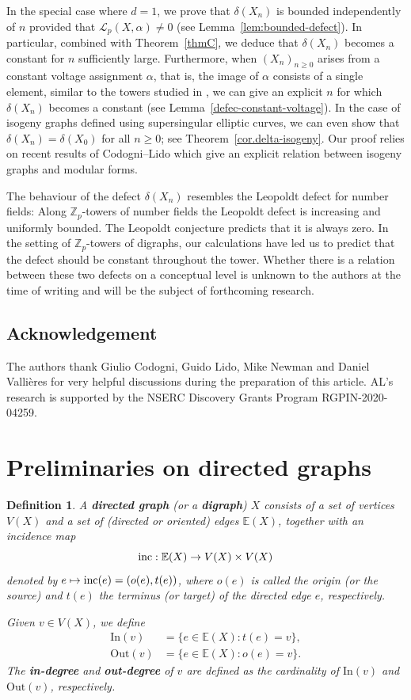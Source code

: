 \documentclass[11pt]{amsart}
\newtheorem{defn}[theorem]{Definition}
\numberwithin{equation}{section}
\theoremstyle{remark}
\newcommand{\EE}{\mathbb{E}}
\newcommand{\?}{\stackrel{?}{=}}
\newcommand{\cL}{\mathcal{L}}
\newcommand{\Z}{\mathbb{Z}}
\newcommand{\In}{\mathrm{In}}
\newcommand{\Out}{\mathrm{Out}}
\begin{document}
In the special case where $d=1$, we prove that $\delta(X_n)$ is bounded independently of $n$ provided that $\cL_p(X,\alpha)\ne0$  (see Lemma~\ref{lem:bounded-defect}). In particular, combined with Theorem~\ref{thmC}, we deduce that $\delta(X_n)$ becomes a constant for $n$ sufficiently large. Furthermore, when $(X_n)_{n\ge0}$ arises from a constant voltage assignment $\alpha$, that is, the image of $\alpha$ consists of a single element, similar to the towers studied in \cite{constant-voltage}, we can give an explicit $n$ for which $\delta(X_n)$ becomes a constant (see Lemma~\ref{defec-constant-voltage}). In the case of isogeny graphs defined using supersingular elliptic curves, we can even show that $\delta(X_n)=\delta(X_0)$ for all $n\ge0$; see Theorem~\ref{cor.delta-isogeny}. Our proof relies on recent results of Codogni--Lido \cite{codogni-lido} which give an explicit relation between isogeny graphs and modular forms. 

The behaviour of the defect $\delta(X_n)$ resembles the Leopoldt defect for number fields: Along $\Z_p$-towers of number fields the Leopoldt defect is increasing and uniformly bounded. The Leopoldt conjecture predicts that it is always zero. In the setting of $\Z_p$-towers of digraphs, our calculations have led us to predict that the defect should be constant throughout the tower. Whether there is a relation between these two defects on a conceptual level is unknown to the authors at the time of writing and will be the subject of forthcoming research.  

\subsection*{Acknowledgement}
The authors thank Giulio Codogni, Guido Lido, Mike Newman and Daniel Vallières for very helpful discussions during the preparation of this article. AL's research is supported by the NSERC Discovery Grants Program RGPIN-2020-04259.


\section{Preliminaries on directed graphs}

\begin{defn}
A \textbf{directed graph} (or a \textbf{digraph}) $X$ consists of a set of vertices $V(X)$ and a set of (directed or oriented) edges $\EE(X)$, together with an incidence map 
$${\rm inc}:\EE(X) \rightarrow V(X) \times V(X)$$ 
denoted by $e \mapsto {\rm inc}(e) = (o(e),t(e))$, where $o(e)$ is called the origin (or the source) and $t(e)$ the terminus (or target) of the directed edge $e$, respectively.  

Given $v\in V(X)$, we define
\begin{align*}
    \In(v)&=\{e\in\EE(X):t(e)=v\},\\
    \Out(v)&=\{e\in\EE(X):o(e)=v\}.
\end{align*}
The \textbf{in-degree} and \textbf{out-degree} of $v$ are defined as the cardinality of $\In(v)$ and $\Out(v)$, respectively.
\end{defn}
\end{document}
